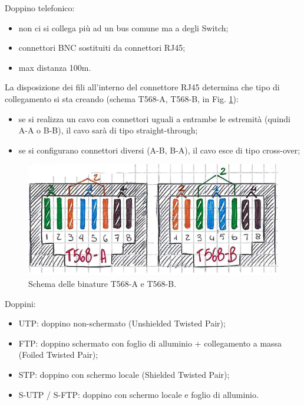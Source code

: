 \noindent Doppino telefonico:
\begin{itemize}
    \item non ci si collega più ad un bus comune ma a degli Switch;
    \item connettori BNC sostituiti da connettori RJ45;
    \item max distanza 100m.
\end{itemize}

\noindent La disposizione dei fili all'interno del connettore RJ45 determina che tipo di collegamento si sta creando (schema T568-A, T568-B, in Fig. \ref{fig:06RJ45}):
\begin{itemize}
    \item se si realizza un cavo con connettori uguali a entrambe le estremità (quindi A-A o B-B), il cavo sarà di tipo straight-through;
    \item se si configurano connettori diversi (A-B, B-A), il cavo esce di tipo cross-over;
\end{itemize}

\begin{figure} [ht]
    \centering
    \includegraphics[width=0.75\linewidth]{Figures//06/rj45ab.png}
    \caption{Schema delle binature T568-A e T568-B.}
    \label{fig:06RJ45}
\end{figure}

\noindent Doppini:
\begin{itemize}
    \item UTP: doppino non-schermato (Unshielded Twisted Pair);
    \item FTP: doppino schermato con foglio di alluminio + collegamento a massa (Foiled Twisted Pair);
    \item STP: doppino con schermo locale (Shielded Twisted Pair);
    \item S-UTP / S-FTP: doppino con schermo locale e foglio di alluminio.
\end{itemize}


